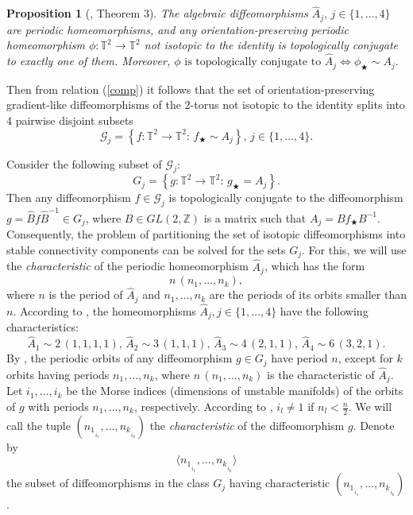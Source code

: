 \documentclass{amsart}
\newtheorem{propos}{Proposition}
\numberwithin{equation}{section}
\begin{document}
	\begin{propos}[\cite{BGPC}, Theorem 3]\label{perA} The algebraic diffeomorphisms $\widehat A_j,\,j\in\{1,\dots,4\}$ are periodic homeomorphisms, and any orientation-preserving periodic homeomorphism $\phi:\mathbb T^2\to\mathbb T^2$ not isotopic to the identity is topologically conjugate to exactly one of them. Moreover,
		$\phi\,\,\text{is topologically conjugate to}\,\,\widehat A_j\iff \phi_\bigstar\sim A_j.$
	\end{propos}
	
	Then from relation (\ref{comp}) it follows that the set of orientation-preserving gradient-like diffeomorphisms of the 2-torus not isotopic to the identity splits into 4 pairwise disjoint subsets $$\mathcal G_j=\left\{f:\mathbb T^2\to\mathbb T^2:\,f_\bigstar\sim A_j\right\},\,j\in\{1,\dots,4\}.$$
	
	Consider the following subset of $\mathcal G_j$: $$G_j=\left\{g:\mathbb T^2\to\mathbb T^2:\,g_\bigstar=A_j\right\}.$$
	Then any diffeomorphism $f\in\mathcal G_j$ is topologically conjugate to the diffeomorphism $g=\widehat B f\widehat B^{-1}\in G_j$, where $B\in GL(2,\mathbb Z)$ is a matrix such that $A_j=Bf_\bigstar B^{-1}$. Consequently, the problem of partitioning the set of isotopic diffeomorphisms into stable connectivity components can be solved for the sets $G_j$. For this, we will use the {\it characteristic} of the periodic homeomorphism $\widehat A_j$, which has the form $$n\,(n_1,\dots,n_k),$$ where $n$ is the period of $\widehat A_j$ and $n_1,\dots,n_k$ are the periods of its orbits smaller than $n$. According to \cite{BGPC}, 
	the homeomorphisms $\widehat A_j,j\in\{1,\dots,4\}$ have the following characteristics:
	$$\widehat A_1\sim 2\,(1,1,1,1),\,\widehat A_2\sim 3\,(1,1,1),\,\widehat A_3\sim 4\,(2,1,1),\,\widehat A_4\sim 6\,(3,2,1).$$
	By \cite{treh}, the periodic orbits of any diffeomorphism $g\in G_j$ have period $n$, except for $k$ orbits having periods $n_1,\dots,n_k$, where $n\,(n_1,\dots,n_k)$ is the characteristic of $\widehat A_j$. Let $i_1,\dots,i_k$ be the Morse indices (dimensions of unstable manifolds) of the orbits of $g$ with periods $n_1,\dots,n_k$, respectively. According to \cite{treh}, $i_l\neq 1$ if $n_l<\frac{n}{2}$. We will call the tuple $({n_1}_{_{i_1}},\dots,{n_k}_{_{i_k}})$ the {\it characteristic} of the diffeomorphism $g$. Denote by $$\langle {n_1}_{_{i_1}},\dots,{n_k}_{_{i_k}}\rangle$$ the subset of diffeomorphisms in the class $G_j$ having characteristic $({n_1}_{_{i_1}},\dots,{n_k}_{_{i_k}})$.
	
\end{document}
